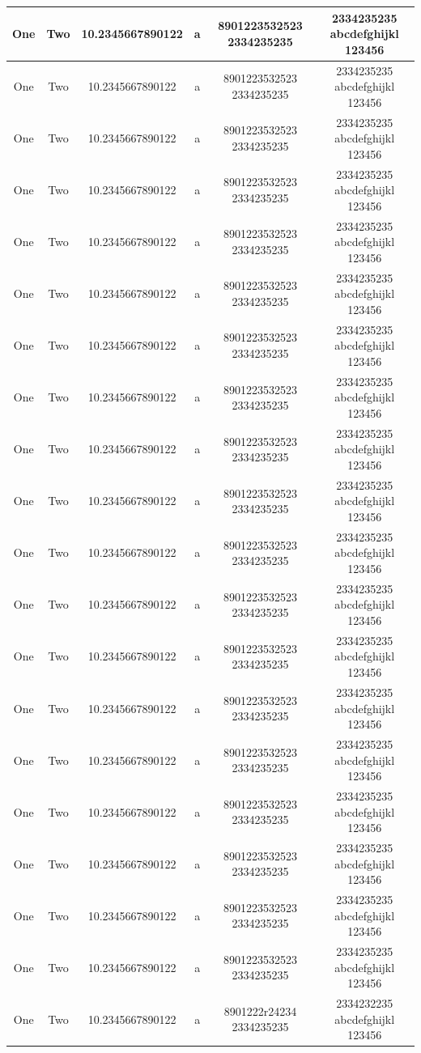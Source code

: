 \begin{landscape}
\begin{longtable}{c|c|c|c|c|c}
One & Two & 10.2345667890122 & a & 8901223532523 2334235235 & 2334235235 abcdefghijkl 123456\\ \hline
One & Two & 10.2345667890122 & a & 8901223532523 2334235235 & 2334235235 abcdefghijkl 123456\\ \hline
One & Two & 10.2345667890122 & a & 8901223532523 2334235235 & 2334235235 abcdefghijkl 123456\\ \hline
One & Two & 10.2345667890122 & a & 8901223532523 2334235235 & 2334235235 abcdefghijkl 123456\\ \hline
One & Two & 10.2345667890122 & a & 8901223532523 2334235235 & 2334235235 abcdefghijkl 123456\\ \hline
One & Two & 10.2345667890122 & a & 8901223532523 2334235235 & 2334235235 abcdefghijkl 123456\\ \hline
One & Two & 10.2345667890122 & a & 8901223532523 2334235235 & 2334235235 abcdefghijkl 123456\\ \hline
One & Two & 10.2345667890122 & a & 8901223532523 2334235235 & 2334235235 abcdefghijkl 123456\\ \hline
One & Two & 10.2345667890122 & a & 8901223532523 2334235235 & 2334235235 abcdefghijkl 123456\\ \hline
One & Two & 10.2345667890122 & a & 8901223532523 2334235235 & 2334235235 abcdefghijkl 123456\\ \hline
One & Two & 10.2345667890122 & a & 8901223532523 2334235235 & 2334235235 abcdefghijkl 123456\\ \hline
One & Two & 10.2345667890122 & a & 8901223532523 2334235235 & 2334235235 abcdefghijkl 123456\\ \hline
One & Two & 10.2345667890122 & a & 8901223532523 2334235235 & 2334235235 abcdefghijkl 123456\\ \hline
One & Two & 10.2345667890122 & a & 8901223532523 2334235235 & 2334235235 abcdefghijkl 123456\\ \hline
One & Two & 10.2345667890122 & a & 8901223532523 2334235235 & 2334235235 abcdefghijkl 123456\\ \hline
One & Two & 10.2345667890122 & a & 8901223532523 2334235235 & 2334235235 abcdefghijkl 123456\\ \hline
One & Two & 10.2345667890122 & a & 8901223532523 2334235235 & 2334235235 abcdefghijkl 123456\\ \hline
One & Two & 10.2345667890122 & a & 8901223532523 2334235235 & 2334235235 abcdefghijkl 123456\\ \hline
One & Two & 10.2345667890122 & a & 8901223532523 2334235235 & 2334235235 abcdefghijkl 123456\\ \hline
One & Two & 10.2345667890122 & a & 8901222r24234 2334235235 & 2334232235 abcdefghijkl 123456\\
\end{longtable}

\end{landscape}

\lipsum[1]